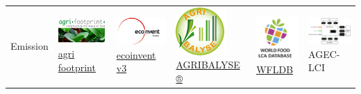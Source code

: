 \documentclass[openany]{book}
\begin{document}
\begin{longtable}[]{@{}llllll@{}}
\begin{minipage}[b]{0.17\columnwidth}
\end{minipage}\tabularnewline
\midrule
\endfirsthead
\toprule
\begin{minipage}[b]{0.12\columnwidth}\raggedright
Emission\strut
\end{minipage} & \begin{minipage}[b]{0.16\columnwidth}\raggedright
\includegraphics{Figures/agri-footprint.png} \href{https://www.agri-footprint.com/}{agri footprint} \citep{durlinger2017}\strut
\end{minipage} & \begin{minipage}[b]{0.12\columnwidth}\raggedright
\includegraphics{Figures/ecoinvent.png} \href{https://www.ecoinvent.org/}{ecoinvent v3} \citep{nemecek2011}\strut
\end{minipage} & \begin{minipage}[b]{0.13\columnwidth}\raggedright
\includegraphics{Figures/agribalyse.png} \href{https://www.ademe.fr/en/expertise/alternative-approaches-to-production/agribalyse-program}{AGRIBALYSE ®} \citep{Koch2015}\strut
\end{minipage} & \begin{minipage}[b]{0.12\columnwidth}\raggedright
\includegraphics{Figures/WFLDB.png} \href{https://quantis-intl.com/tools/databases/wfldb-food/}{WFLDB} \citep{nemecek2014}\strut
\end{minipage} & \begin{minipage}[b]{0.17\columnwidth}\raggedright
\includegraphics{Figures/agec_lci_logo.png} AGEC-LCI\strut

\end{minipage}
\end{longtable}
\end{document}
